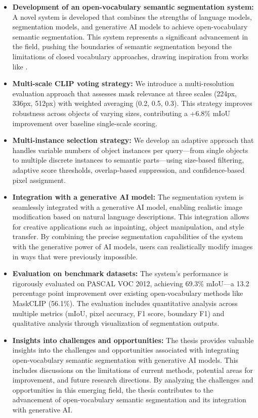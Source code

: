 \begin{itemize}
\item \textbf{Development of an open-vocabulary semantic segmentation system:} A novel system is developed that combines the strengths of language models, segmentation models, and generative AI models to achieve open-vocabulary semantic segmentation. This system represents a significant advancement in the field, pushing the boundaries of semantic segmentation beyond the limitations of closed vocabulary approaches, drawing inspiration from works like \cite{ghiasi2022open}.

\item \textbf{Multi-scale CLIP voting strategy:} We introduce a multi-resolution evaluation approach that assesses mask relevance at three scales (224px, 336px, 512px) with weighted averaging (0.2, 0.5, 0.3). This strategy improves robustness across objects of varying sizes, contributing a +6.8\% mIoU improvement over baseline single-scale scoring.

\item \textbf{Multi-instance selection strategy:} We develop an adaptive approach that handles variable numbers of object instances per query—from single objects to multiple discrete instances to semantic parts—using size-based filtering, adaptive score thresholds, overlap-based suppression, and confidence-based pixel assignment.

\item \textbf{Integration with a generative AI model:} The segmentation system is seamlessly integrated with a generative AI model, enabling realistic image modification based on natural language descriptions. This integration allows for creative applications such as inpainting, object manipulation, and style transfer. By combining the precise segmentation capabilities of the system with the generative power of AI models, users can realistically modify images in ways that were previously impossible.

\item \textbf{Evaluation on benchmark datasets:} The system's performance is rigorously evaluated on PASCAL VOC 2012, achieving 69.3\% mIoU—a 13.2 percentage point improvement over existing open-vocabulary methods like MaskCLIP (56.1\%). The evaluation includes quantitative analysis across multiple metrics (mIoU, pixel accuracy, F1 score, boundary F1) and qualitative analysis through visualization of segmentation outputs.

\item \textbf{Insights into challenges and opportunities:} The thesis provides valuable insights into the challenges and opportunities associated with integrating open-vocabulary semantic segmentation with generative AI models. This includes discussions on the limitations of current methods, potential areas for improvement, and future research directions. By analyzing the challenges and opportunities in this emerging field, the thesis contributes to the advancement of open-vocabulary semantic segmentation and its integration with generative AI.


\end{itemize}
